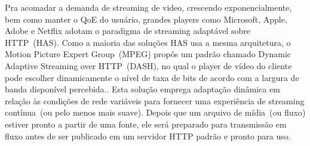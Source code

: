 
Pra acomadar a demanda de streaming de video, crescendo exponencialmente, bem como manter o QoE do usuário, grandes players como Microsoft, Apple, Adobe e Netflix adotam o paradigma de streaming adaptável sobre HTTP~(HAS). Como a maioria das soluções HAS usa a mesma arquitetura, o Motion Picture Expert Group~(MPEG) propôs um padrão chamado Dynamic Adaptive Streaming over HTTP~(DASH), no qual o player de vídeo do cliente pode escolher dinamicamente o nível de taxa de bits de acordo com a largura de banda disponível percebida..
Esta solução emprega adaptação dinâmica em relação às condições de rede variáveis para fornecer uma experiência de streaming contínua~(ou pelo menos mais suave). Depois que um arquivo de mídia~(ou fluxo) estiver pronto a partir de uma fonte, ele será preparado para transmissão em fluxo antes de ser publicado em um servidor HTTP padrão e pronto para uso.

